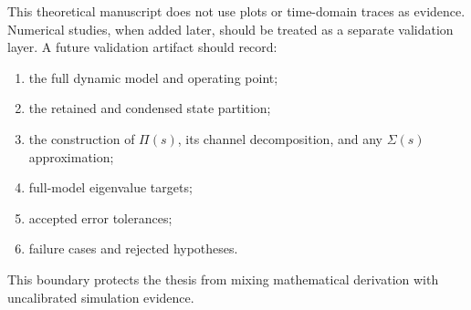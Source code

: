 This theoretical manuscript does not use plots or time-domain traces as
evidence. Numerical studies, when added later, should be treated as a separate
validation layer. A future validation artifact should record:

\begin{enumerate}
\item the full dynamic model and operating point;
\item the retained and condensed state partition;
\item the construction of \(\Pi(s)\), its channel decomposition, and any
\(\Sigma(s)\) approximation;
\item full-model eigenvalue targets;
\item accepted error tolerances;
\item failure cases and rejected hypotheses.
\end{enumerate}

This boundary protects the thesis from mixing mathematical derivation with
uncalibrated simulation evidence.
